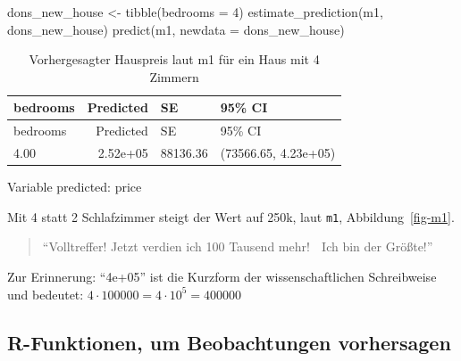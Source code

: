 \documentclass[
  a4paper,
  DIV=11]{scrreprt}
\newenvironment{Shaded}{\begin{snugshade}}{\end{snugshade}}
\newcommand{\AttributeTok}[1]{\textcolor[rgb]{0.40,0.45,0.13}{#1}}
\newcommand{\DecValTok}[1]{\textcolor[rgb]{0.68,0.00,0.00}{#1}}
\newcommand{\FunctionTok}[1]{\textcolor[rgb]{0.28,0.35,0.67}{#1}}
\newcommand{\NormalTok}[1]{\textcolor[rgb]{0.00,0.23,0.31}{#1}}
\newcommand{\OtherTok}[1]{\textcolor[rgb]{0.00,0.23,0.31}{#1}}
\theoremstyle{definition}
\theoremstyle{remark}
\begin{document}
\begin{Shaded}
\begin{Highlighting}[]
\NormalTok{dons\_new\_house }\OtherTok{\textless{}{-}} \FunctionTok{tibble}\NormalTok{(}\AttributeTok{bedrooms =} \DecValTok{4}\NormalTok{)}
\FunctionTok{estimate\_prediction}\NormalTok{(m1, dons\_new\_house)}
\FunctionTok{predict}\NormalTok{(m1, }\AttributeTok{newdata =}\NormalTok{ dons\_new\_house)}
\end{Highlighting}
\end{Shaded}

\hypertarget{tbl-m1-pred2a}{}
\begin{longtable}[]{@{}lrll@{}}
\caption{\label{tbl-m1-pred2a}Vorhergesagter Hauspreis laut m1 für ein
Haus mit 4 Zimmern}\tabularnewline
\toprule()
bedrooms & Predicted & SE & 95\% CI \\
\midrule()
\endfirsthead
\toprule()
bedrooms & Predicted & SE & 95\% CI \\
\midrule()
\endhead
4.00 & 2.52e+05 & 88136.36 & (73566.65, 4.23e+05) \\
\bottomrule()
\end{longtable}

Variable predicted: price

Mit 4 statt 2 Schlafzimmer steigt der Wert auf 250k, laut \texttt{m1},
Abbildung~\ref{fig-m1}.

\begin{quote}
``Volltreffer! Jetzt verdien ich 100 Tausend mehr! 🤑 Ich bin der
Größte!'' 🧑
\end{quote}

\begin{tcolorbox}[enhanced jigsaw, title=\textcolor{quarto-callout-note-color}{\faInfo}\hspace{0.5em}{Hinweis}, bottomtitle=1mm, bottomrule=.15mm, titlerule=0mm, colbacktitle=quarto-callout-note-color!10!white, colframe=quarto-callout-note-color-frame, leftrule=.75mm, left=2mm, toprule=.15mm, colback=white, arc=.35mm, breakable, toptitle=1mm, opacityback=0, rightrule=.15mm, coltitle=black, opacitybacktitle=0.6]

Zur Erinnerung: ``4e+05'' ist die Kurzform der wissenschaftlichen
Schreibweise und bedeutet: \(4 \cdot 100000 = 4\cdot10^5 = 400000\)

\end{tcolorbox}

\hypertarget{r-funktionen-um-beobachtungen-vorhersagen}{%
\subsection{R-Funktionen, um Beobachtungen
vorhersagen}\label{r-funktionen-um-beobachtungen-vorhersagen}}
\end{document}
